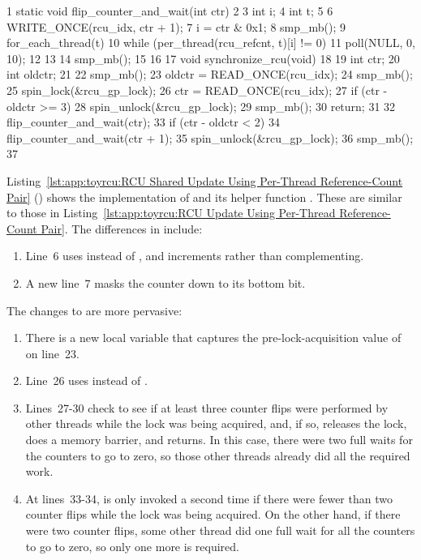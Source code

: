 \begin{listing}[tbp]
{ \scriptsize
\begin{verbbox}
  1 static void flip_counter_and_wait(int ctr)
  2 {
  3   int i;
  4   int t;
  5
  6   WRITE_ONCE(rcu_idx, ctr + 1);
  7   i = ctr & 0x1;
  8   smp_mb();
  9   for_each_thread(t) {
 10     while (per_thread(rcu_refcnt, t)[i] != 0) {
 11       poll(NULL, 0, 10);
 12     }
 13   }
 14   smp_mb();
 15 }
 16
 17 void synchronize_rcu(void)
 18 {
 19   int ctr;
 20   int oldctr;
 21
 22   smp_mb();
 23   oldctr = READ_ONCE(rcu_idx);
 24   smp_mb();
 25   spin_lock(&rcu_gp_lock);
 26   ctr = READ_ONCE(rcu_idx);
 27   if (ctr - oldctr >= 3) {
 28     spin_unlock(&rcu_gp_lock);
 29     smp_mb();
 30     return;
 31   }
 32   flip_counter_and_wait(ctr);
 33   if (ctr - oldctr < 2)
 34     flip_counter_and_wait(ctr + 1);
 35   spin_unlock(&rcu_gp_lock);
 36   smp_mb();
 37 }
\end{verbbox}
}
\centering
\theverbbox
\caption{RCU Shared Update Using Per-Thread Reference-Count Pair}
\label{lst:app:toyrcu:RCU Shared Update Using Per-Thread Reference-Count Pair}
\end{listing}

Listing~\ref{lst:app:toyrcu:RCU Shared Update Using Per-Thread Reference-Count Pair}
()
shows the implementation of  and its helper
function .
These are similar to those in
Listing~\ref{lst:app:toyrcu:RCU Update Using Per-Thread Reference-Count Pair}.
The differences in  include:
\begin{enumerate}
\item	Line~6 uses  instead of ,
	and increments rather than complementing.
\item	A new line~7 masks the counter down to its bottom bit.
\end{enumerate}

The changes to  are more pervasive:
\begin{enumerate}
\item	There is a new  local variable that captures
	the pre-lock-acquisition value of  on
	line~23.
\item	Line~26 uses  instead of .
\item	Lines~27-30 check to see if at least three counter flips were
	performed by other threads while the lock was being acquired,
	and, if so, releases the lock, does a memory barrier, and returns.
	In this case, there were two full waits for the counters to
	go to zero, so those other threads already did all the required work.
\item	At lines~33-34,  is only
	invoked a second time if there were fewer than two counter flips
	while the lock was being acquired.
	On the other hand, if there were two counter flips, some other
	thread did one full wait for all the counters to go to zero,
	so only one more is required.
\end{enumerate}

